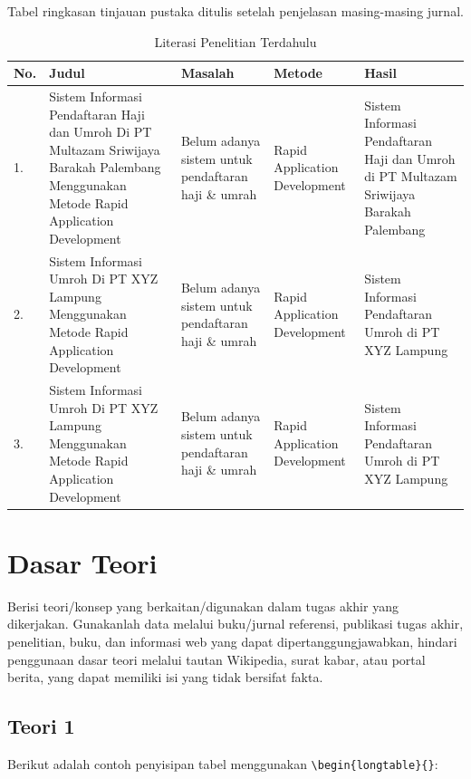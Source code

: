 Tabel ringkasan tinjauan pustaka ditulis setelah penjelasan masing-masing jurnal. \par
\begin{longtable}{| b{}|p{}|p{}|p{}|p{}|} %
	\caption{Literasi Penelitian Terdahulu}
	\label{table:2.literasi}\\
	\hline
	\textbf{No.} & \textbf{Judul} & \textbf{Masalah} & \textbf{Metode} & \textbf{Hasil} \\
	\hline
	\endhead %
	1. & Sistem Informasi Pendaftaran Haji dan Umroh Di PT Multazam Sriwijaya Barakah Palembang Menggunakan Metode Rapid Application Development & Belum adanya sistem untuk pendaftaran haji \& umrah & Rapid Application Development & Sistem Informasi Pendaftaran Haji dan Umroh di PT Multazam Sriwijaya Barakah Palembang\\ 
	\hline
	2. & Sistem Informasi Umroh Di PT XYZ Lampung Menggunakan Metode Rapid Application Development & Belum adanya sistem untuk pendaftaran haji \& umrah & Rapid Application Development & Sistem Informasi Pendaftaran Umroh di PT XYZ Lampung\\ 
	\hline
	3. & Sistem Informasi Umroh Di PT XYZ Lampung Menggunakan Metode Rapid Application Development & Belum adanya sistem untuk pendaftaran haji \& umrah & Rapid Application Development & Sistem Informasi Pendaftaran Umroh di PT XYZ Lampung\\ 
	\hline
\end{longtable}

\section{Dasar Teori} \label{II.Teori}
Berisi teori/konsep yang berkaitan/digunakan dalam tugas akhir yang dikerjakan. Gunakanlah data melalui buku/jurnal referensi, publikasi tugas akhir, penelitian, buku, dan informasi web yang dapat dipertanggungjawabkan, hindari penggunaan dasar teori melalui tautan Wikipedia, surat kabar, atau portal berita, yang dapat memiliki isi yang tidak bersifat fakta. \par

\subsection{Teori 1} \label{II.Teori1}
Berikut adalah contoh penyisipan tabel menggunakan \verb|\begin{longtable}{}|: \par
	
